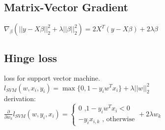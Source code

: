\subsection*{Matrix-Vector Gradient}
$\nabla_\beta ( ||y-X\beta||_2^2 + \lambda ||\beta||_2^2 ) = 2X^T (y-X\beta) + 2\lambda \beta$\\

\subsection*{Hinge loss}
loss for support vector machine.\\
$l_{SVM}(w,x_i,y_i) = \max \{0,1-y_iw^Tx_i\} + \lambda ||w||_2^2$\\
derivation:\\
$\frac{\partial}{\partial w_k} l_{SVM}(w,y_i,x_i) = \left \{
	\begin{array}{lr}
		0 \text{ ,} 1-y_iw^Tx_i<0 \\
		-y_ix_{i,k} \text{ , otherwise}
	\end{array}
	+ 2\lambda w_k
$
